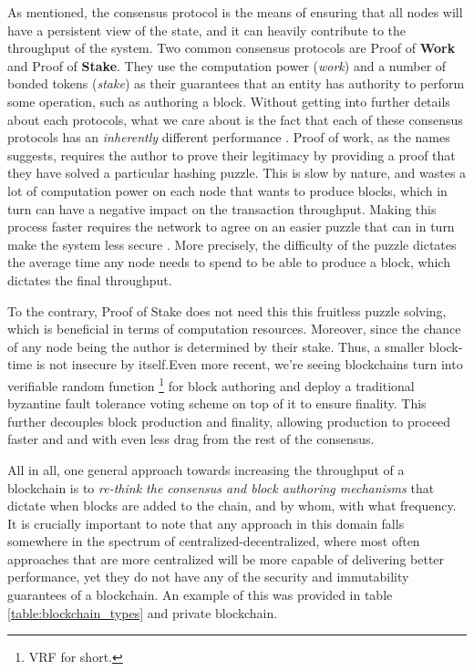 As mentioned, the consensus protocol is the means of ensuring that all nodes will have a persistent
view of the state, and it can heavily contribute to the throughput of the system. Two common
consensus protocols are Proof of \textbf{Work} and Proof of \textbf{Stake}. They use the computation
power (\textit{work}) and a number of bonded tokens (\textit{stake}) as their guarantees
that an entity has authority to perform some operation, such as authoring a block. Without getting
into further details about each protocols, what we care about is the fact that each of these
consensus protocols has an \textit{inherently} different performance \cite{survey_on_all}. Proof of work, as
the names suggests, requires the author to prove their legitimacy by providing a proof that they
have solved a particular hashing puzzle. This is slow by nature, and wastes a lot of computation
power on each node that wants to produce blocks, which in turn can have a negative impact on the
transaction throughput. Making this process faster requires the network to agree on an easier
puzzle that can in turn make the system less secure \cite{security_of_bitcoin}. More precisely, the
difficulty of the puzzle dictates the average time any node needs to spend to be able to produce a
block, which dictates the final throughput.

To the contrary, Proof of Stake does not need this this fruitless puzzle solving, which is
beneficial in terms of computation resources. Moreover, since the chance of any node being the
author is determined by their stake. Thus, a smaller block-time is not insecure by itself.Even more
recent, we're seeing blockchains turn into verifiable random
function \cite{Dodis_Yampolskiy_2005_VRF}\footnote{VRF for short.} for block authoring and deploy a
traditional byzantine fault tolerance voting scheme on top of it to ensure finality. This further
decouples block production and finality, allowing production to proceed faster and and with even
less drag from the rest of the consensus.

All in all, one general approach towards increasing the throughput of a blockchain is to
\textit{re-think the consensus and block authoring mechanisms} that dictate when blocks are added to
the chain, and by whom, with what frequency. It is crucially important to note that any approach in
this domain falls somewhere in the spectrum of centralized-decentralized, where most often
approaches that are more centralized will be more capable of delivering better performance, yet they
do not have any of the security and immutability guarantees of a blockchain. An example of this was
provided in table \ref{table:blockchain_types} and private blockchain.

